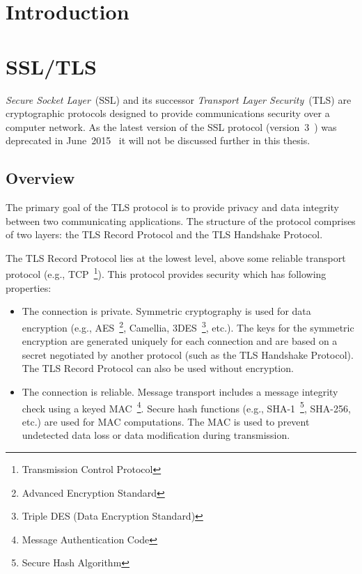 
\chapter{Introduction}
\chapter{SSL/TLS}
    \textit{Secure Socket Layer}~(SSL) and its successor
    \textit{Transport Layer Security}~(TLS) are cryptographic protocols
    designed to provide communications security over a computer network. As
    the latest version of the SSL protocol (version~3~\cite{rfc6101}) was
    deprecated in June~2015~\cite{rfc7568} it will not be discussed
    further in this thesis.
\section{Overview}
    The primary goal of the TLS protocol is to provide privacy and data
    integrity between two communicating applications. The structure of
    the protocol comprises of two layers: the TLS Record Protocol and
    the TLS Handshake Protocol.

    The TLS Record Protocol lies at the lowest level, above some reliable
    transport protocol (e.g., TCP~\footnote{Transmission Control Protocol}).
    This protocol provides security which has following properties:
    \begin{itemize}
        \item The connection is private. Symmetric cryptography is used
        for data encryption (e.g., AES~\footnote{Advanced Encryption Standard},
        Camellia, 3DES~\footnote{Triple DES (Data Encryption Standard)}, etc.).
        The keys for the symmetric encryption are generated uniquely
        for each connection
        and are based on a secret negotiated by another protocol
        (such as the TLS Handshake Protocol). The TLS Record Protocol can also
        be used without encryption.
        \item The connection is reliable. Message transport includes
        a message integrity check using a keyed
        MAC~\footnote{Message Authentication Code}. Secure hash functions
        (e.g., SHA-1~\footnote{Secure Hash Algorithm}, SHA-256, etc.) are
        used for MAC computations. The MAC is used to prevent undetected
        data loss or data modification during transmission.
    \end{itemize}

